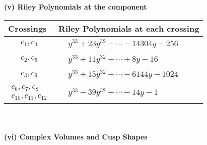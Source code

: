 \documentclass[1p]{elsarticle_modified}
\theoremstyle{definition}
\begin{document}
\newpage\renewcommand{\arraystretch}{1}
\flushleft \textbf{(v) Riley Polynomials at the component}\newline \\
\begin{tabular}{m{50pt}|m{274pt}}
Crossings & \hspace{64pt}Riley Polynomials at each crossing \\
\hline $$\begin{aligned}c_{1},c_{4}\end{aligned}$$&$\begin{aligned}
&y^{33}+23 y^{32}+\cdots-14304 y-256
\end{aligned}$\\
\hline $$\begin{aligned}c_{2},c_{5}\end{aligned}$$&$\begin{aligned}
&y^{33}+11 y^{32}+\cdots+8 y-16
\end{aligned}$\\
\hline $$\begin{aligned}c_{3},c_{9}\end{aligned}$$&$\begin{aligned}
&y^{33}+15 y^{32}+\cdots-6144 y-1024
\end{aligned}$\\
\hline $$\begin{aligned}c_{6},c_{7},c_{8}\\c_{10},c_{11},c_{12}\end{aligned}$$&$\begin{aligned}
&y^{33}-39 y^{32}+\cdots-14 y-1
\end{aligned}$\\
\hline
\end{tabular}\\~\\
\newpage\flushleft \textbf{(vi) Complex Volumes and Cusp Shapes}
\end{document}
